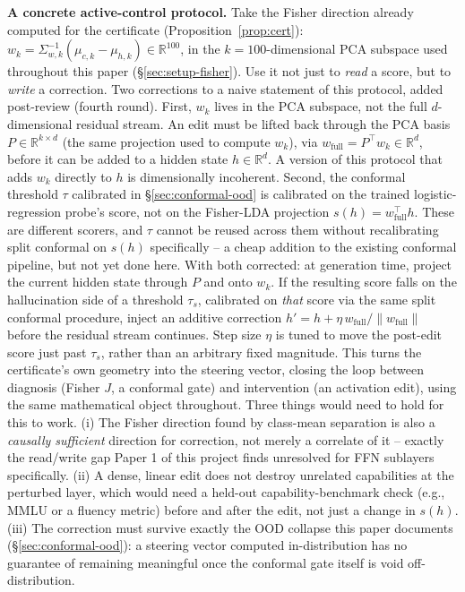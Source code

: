 \documentclass[10pt,twocolumn]{article}
\begin{document}
\textbf{A concrete active-control protocol.} Take the Fisher direction
already computed for the certificate (Proposition~\ref{prop:cert}):
$w_k = \Sigma_{w,k}^{-1}(\mu_{c,k} - \mu_{h,k}) \in \mathbb{R}^{100}$,
in the $k{=}100$-dimensional PCA subspace used throughout this paper
(\S\ref{sec:setup-fisher}). Use it not just to \emph{read} a score, but
to \emph{write} a correction. Two corrections to a naive statement of
this protocol, added post-review (fourth round). First, $w_k$ lives in
the PCA subspace, not the full $d$-dimensional residual stream. An edit
must be lifted back through the PCA basis $P \in \mathbb{R}^{k \times
d}$ (the same projection used to compute $w_k$), via $w_{\text{full}} =
P^\top w_k \in \mathbb{R}^d$, before it can be added to a hidden state
$h \in \mathbb{R}^d$. A version of this protocol that adds $w_k$
directly to $h$ is dimensionally incoherent. Second, the conformal
threshold $\tau$ calibrated in \S\ref{sec:conformal-ood} is calibrated
on the trained logistic-regression probe's score, not on the
Fisher-LDA projection $s(h) = w_{\text{full}}^\top h$. These are
different scorers, and $\tau$ cannot be reused across them without
recalibrating split conformal on $s(h)$ specifically -- a cheap
addition to the existing conformal pipeline, but not yet done here.
With both corrected: at generation time, project the current hidden
state through $P$ and onto $w_k$. If the resulting score falls on the
hallucination side of a threshold $\tau_s$, calibrated on \emph{that}
score via the same split conformal procedure, inject an additive
correction $h' = h + \eta \, w_{\text{full}} / \|w_{\text{full}}\|$
before the residual stream continues. Step size $\eta$ is tuned to move
the post-edit score just past $\tau_s$, rather than an arbitrary fixed
magnitude. This turns the certificate's own geometry into the steering
vector, closing the loop between diagnosis (Fisher $J$, a conformal
gate) and intervention (an activation edit), using the same
mathematical object throughout. Three things would need to hold for
this to work. (i) The Fisher direction found by class-mean separation
is also a \emph{causally sufficient} direction for correction, not
merely a correlate of it -- exactly the read/write gap Paper 1 of this
project finds unresolved for FFN sublayers specifically. (ii) A dense,
linear edit does not destroy unrelated capabilities at the perturbed
layer, which would need a held-out capability-benchmark check (e.g.,
MMLU or a fluency metric) before and after the edit, not just a change
in $s(h)$. (iii) The correction must survive exactly the OOD collapse
this paper documents (\S\ref{sec:conformal-ood}): a steering vector
computed in-distribution has no guarantee of remaining meaningful once
the conformal gate itself is void off-distribution.
\end{document}
